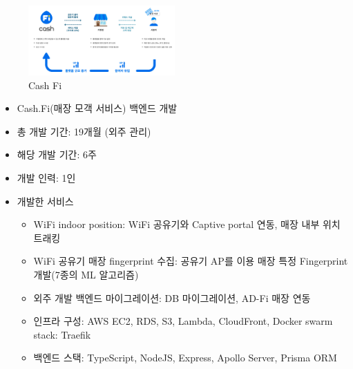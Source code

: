 
\label{cashfi}

\begin{figure}[!ht]
	\begin{fullwidth}
		\parbox{1.6\textwidth}{
			\centering
			\includegraphics[width=0.5\textwidth]{images/cash-fi.png}
			\caption*{Cash Fi}
		}
	\end{fullwidth}
\end{figure}
\begin{itemize}[label=]
	\item Cash.Fi(매장 모객 서비스) 백엔드 개발
	\item 총 개발 기간: 19개월 (외주 관리)
	\item 해당 개발 기간: 6주
	\item 개발 인력: 1인
	\item 개발한 서비스
	      \begin{itemize}[label=]
		      \item WiFi indoor position: WiFi 공유기와 Captive portal 연동, 매장 내부 위치 트래킹
		      \item WiFi 공유기 매장 fingerprint 수집: 공유기 AP를 이용 매장 특정 Fingerprint 개발(7종의 ML 알고리즘)
		      \item 외주 개발 백엔드 마이그레이션: DB 마이그레이션, AD-Fi 매장 연동
		      \item 인프라 구성: AWS EC2, RDS, S3, Lambda, CloudFront, Docker swarm stack: Traefik
		      \item 백엔드 스택: TypeScript, NodeJS, Express, Apollo Server, Prisma ORM
	      \end{itemize}

\end{itemize}